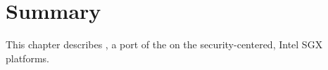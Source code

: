 \section{Summary}

This chapter describes \graphenesgx{},
a port of the \graphene{} \libos{} on the security-centered, Intel SGX platforms.
